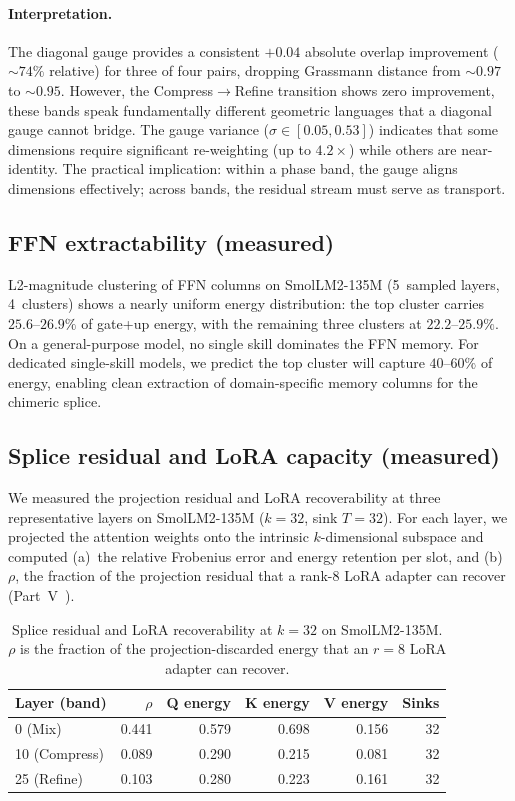 \documentclass[11pt]{article}
\begin{document}
\paragraph{Interpretation.} The diagonal gauge provides a consistent
$+0.04$ absolute overlap improvement (${\sim}74\%$ relative) for three
of four pairs, dropping Grassmann distance from ${\sim}0.97$ to
${\sim}0.95$. However, the Compress$\to$Refine transition shows
zero improvement, these bands speak fundamentally different
geometric languages that a diagonal gauge cannot bridge. The gauge
variance ($\sigma{\in}[0.05,0.53]$) indicates that some dimensions
require significant re-weighting (up to $4.2\times$) while others
are near-identity. The practical implication: within a phase band,
the gauge aligns dimensions effectively; across bands, the residual
stream must serve as transport.

\subsection{FFN extractability (measured)}

L2-magnitude clustering of FFN columns on SmolLM2-135M (5~sampled
layers, 4~clusters) shows a nearly uniform energy distribution:
the top cluster carries $25.6$--$26.9\%$ of gate+up energy, with
the remaining three clusters at $22.2$--$25.9\%$. On a
general-purpose model, no single skill dominates the FFN memory.
For dedicated single-skill models, we predict the top cluster will
capture $40$--$60\%$ of energy, enabling clean extraction of
domain-specific memory columns for the chimeric splice.

\subsection{Splice residual and LoRA capacity (measured)}

We measured the projection residual and LoRA recoverability at three
representative layers on SmolLM2-135M ($k{=}32$, sink $T{=}32$).
For each layer, we projected the attention weights onto the intrinsic
$k$-dimensional subspace and computed (a)~the relative Frobenius error
and energy retention per slot, and (b)~$\rho$, the fraction of the
projection residual that a rank-$8$ LoRA adapter can recover
(Part~V~\cite{stewart2026distill}).

\begin{table}[h]\centering\small
\caption{Splice residual and LoRA recoverability at $k{=}32$ on
SmolLM2-135M. $\rho$ is the fraction of the projection-discarded
energy that an $r{=}8$ LoRA adapter can recover.}
\label{tab:splice-residual}
\begin{tabular}{@{}lrrrrr@{}}
\toprule
Layer (band) & $\rho$ & Q energy & K energy & V energy & Sinks \\
\midrule
0 (Mix) & 0.441 & 0.579 & 0.698 & 0.156 & 32 \\
10 (Compress) & 0.089 & 0.290 & 0.215 & 0.081 & 32 \\
25 (Refine) & 0.103 & 0.280 & 0.223 & 0.161 & 32 \\
\bottomrule
\end{tabular}
\end{table}
\end{document}
